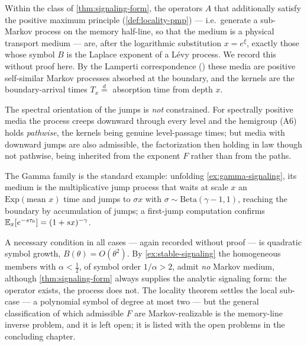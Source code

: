 \begin{remark}\label{rem:markov-media}
Within the class of \ref{thm:signaling-form}, the operators $A$ that additionally satisfy the
positive maximum principle (\ref{def:locality-pmp}) --- i.e.\ generate a sub-Markov process on the
memory half-line, so that the medium is a physical transport medium --- are, after the
logarithmic substitution $x = e^\xi$, exactly those whose symbol $B$ is the Laplace exponent of
a Lévy process. We record this without proof here. By the
Lamperti correspondence () these media are positive self-similar
Markov processes absorbed at the boundary, and the kernels are the boundary-arrival times
$T_x \stackrel{d}{=}$ absorption time from depth $x$.

The spectral orientation of the jumps is \emph{not} constrained. For spectrally positive media
the process creeps downward through every level and the hemigroup (A6) holds \emph{pathwise},
the kernels being genuine level-passage times; but media with downward jumps are also
admissible, the factorization then holding in law though not pathwise, being inherited from
the exponent $F$ rather than from the paths.

The Gamma family is the standard example: unfolding \ref{ex:gamma-signaling}, its medium is
the multiplicative jump process that waits at scale $x$ an $\mathrm{Exp}(\text{mean } x)$ time
and jumps to $\sigma x$ with $\sigma \sim \mathrm{Beta}(\gamma-1, 1)$, reaching the boundary by
accumulation of jumps; a first-jump computation confirms
$\mathbb{E}_x[e^{-s\tau_0}] = (1+sx)^{-\gamma}$.

A necessary condition in all cases --- again recorded without proof --- is quadratic symbol
growth, $B(\theta) = O(\theta^2)$. By \ref{ex:stable-signaling} the homogeneous members with
$\alpha < \tfrac12$, of symbol order $1/\alpha > 2$, admit \emph{no} Markov medium, although
\ref{thm:signaling-form} always supplies the analytic signaling form: the operator exists, the
process does not. The locality theorem settles the local sub-case --- a polynomial symbol of
degree at most two --- but the general classification of which admissible $F$ are
Markov-realizable is the memory-line inverse problem, and it is left open; it is listed with the
open problems in the concluding chapter.
\end{remark}


